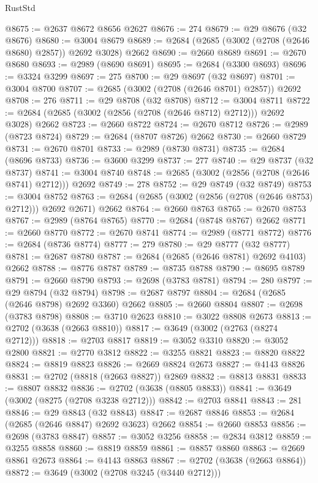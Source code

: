 \begin{lexlean}{RustStd}
\begin{coremodule}
@8675 := @2637 @8672 @8656 @2627
@8676 := 274
@8679 := @29 @8676 (@32 @8676)
@8680 := @3004 @8679
@8689 := @2684 (@2685 (@3002 (@2708 (@2646 @8680) @2857)) @2692 @3028) @2662
@8690 := @2660 @8689
@8691 := @2670 @8680
@8693 := @2989 (@8690 @8691)
@8695 := @2684 (@3300 @8693)
@8696 := @3324 @3299
@8697 := 275
@8700 := @29 @8697 (@32 @8697)
@8701 := @3004 @8700
@8707 := @2685 (@3002 (@2708 (@2646 @8701) @2857)) @2692
@8708 := 276
@8711 := @29 @8708 (@32 @8708)
@8712 := @3004 @8711
@8722 := @2684 (@2685 (@3002 (@2856 (@2708 (@2646 @8712) @2712))) @2692 @3028) @2662
@8723 := @2660 @8722
@8724 := @2670 @8712
@8726 := @2989 (@8723 @8724)
@8729 := @2684 (@8707 @8726) @2662
@8730 := @2660 @8729
@8731 := @2670 @8701
@8733 := @2989 (@8730 @8731)
@8735 := @2684 (@8696 @8733)
@8736 := @3600 @3299
@8737 := 277
@8740 := @29 @8737 (@32 @8737)
@8741 := @3004 @8740
@8748 := @2685 (@3002 (@2856 (@2708 (@2646 @8741) @2712))) @2692
@8749 := 278
@8752 := @29 @8749 (@32 @8749)
@8753 := @3004 @8752
@8763 := @2684 (@2685 (@3002 (@2856 (@2708 (@2646 @8753) @2712))) @2692 @2671) @2662
@8764 := @2660 @8763
@8765 := @2670 @8753
@8767 := @2989 (@8764 @8765)
@8770 := @2684 (@8748 @8767) @2662
@8771 := @2660 @8770
@8772 := @2670 @8741
@8774 := @2989 (@8771 @8772)
@8776 := @2684 (@8736 @8774)
@8777 := 279
@8780 := @29 @8777 (@32 @8777)
@8781 := @2687 @8780
@8787 := @2684 (@2685 (@2646 @8781) @2692 @4103) @2662
@8788 := @8776 @8787
@8789 := @8735 @8788
@8790 := @8695 @8789
@8791 := @2660 @8790
@8793 := @2698 (@3783 @8781)
@8794 := 280
@8797 := @29 @8794 (@32 @8794)
@8798 := @2687 @8797
@8804 := @2684 (@2685 (@2646 @8798) @2692 @3360) @2662
@8805 := @2660 @8804
@8807 := @2698 (@3783 @8798)
@8808 := @3710 @2623
@8810 := @3022 @8808 @2673
@8813 := @2702 (@3638 (@2663 @8810))
@8817 := @3649 (@3002 (@2763 (@8274 @2712)))
@8818 := @2703 @8817
@8819 := @3052 @3310
@8820 := @3052 @2800
@8821 := @2770 @3812
@8822 := @3255 @8821
@8823 := @8820 @8822
@8824 := @8819 @8823
@8826 := @2669 @8824 @2673
@8827 := @4143 @8826
@8831 := @2702 (@8818 (@2663 @8827)) @2869
@8832 := @8813 @8831
@8833 := @8807 @8832
@8836 := @2702 (@3638 (@8805 @8833))
@8841 := @3649 (@3002 (@8275 (@2708 @3238 @2712)))
@8842 := @2703 @8841
@8843 := 281
@8846 := @29 @8843 (@32 @8843)
@8847 := @2687 @8846
@8853 := @2684 (@2685 (@2646 @8847) @2692 @3623) @2662
@8854 := @2660 @8853
@8856 := @2698 (@3783 @8847)
@8857 := @3052 @3256
@8858 := @2834 @3812
@8859 := @3255 @8858
@8860 := @8819 @8859
@8861 := @8857 @8860
@8863 := @2669 @8861 @2673
@8864 := @4143 @8863
@8867 := @2702 (@3638 (@2663 @8864))
@8872 := @3649 (@3002 (@2708 @3245 (@3440 @2712)))

\end{coremodule}
\end{lexlean}
